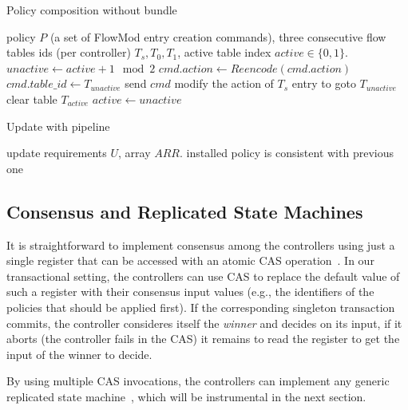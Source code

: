 \documentclass[conference]{sigcomm-alternate}
\begin{document}
\begin{algorithm}[t]
    \caption{Policy composition without bundle}
    \label{alg:wobundle}
    \begin{algorithmic}[1]
    \Require policy $P$ (a set of FlowMod entry creation commands), three consecutive flow tables ids (per controller) $T_s,T_0,T_1$, active table index $active\in\{0,1\}$.
    \State $unactive \gets active + 1 \mod{2}$
	    \State $cmd.action\gets Reencode(cmd.action)$
	    \State $cmd.table\_id\gets T_{unactive}$
	    \State send $cmd$
    \EndFor
    \State modify the action of $T_s$ entry to goto $T_{unactive}$
    \State clear table $T_{active}$
    \State $active \gets unactive$
	\Return

    \end{algorithmic}
\end{algorithm}

\begin{algorithm}[t]
    \caption{Update with pipeline}
    \label{alg:pipeline}
    \begin{algorithmic}[1]
    \Require update requirements $U$, array $ARR$.
    \Ensure installed policy is consistent with previous one
			\Return

    \end{algorithmic}
\end{algorithm}

\subsection{Consensus and Replicated State Machines}

It is straightforward to implement consensus among the controllers
using just a single register that can be accessed with an atomic CAS
operation~\cite{Her91}. In our transactional setting, the controllers
can use CAS to replace the default value of such a register
with their consensus input values (e.g., the identifiers of the
policies that should be applied first). If the corresponding
singleton transaction commits, the controller consideres itself
the \emph{winner} and decides on its input, if
it aborts (the controller fails in the CAS) it remains to read the register to get the input of the
winner to decide.

By using multiple CAS invocations, the controllers can implement any
generic replicated state machine~\cite{Her91,Lam98}, which will be instrumental in the
next section.
\end{document}
